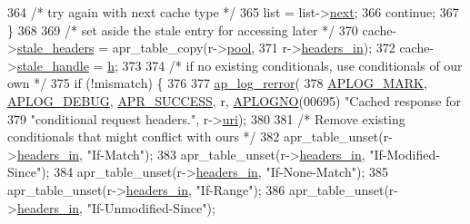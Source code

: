 \begin{DoxyCode}
364                     \textcolor{comment}{/* try again with next cache type */}
365                     list = list->\hyperlink{structcache__provider__list_a87c07afc8bb63fe7fd2e9274e60341a9}{next};
366                     \textcolor{keywordflow}{continue};
367                 \}
368 
369                 \textcolor{comment}{/* set aside the stale entry for accessing later */}
370                 cache->\hyperlink{structcache__request__rec_a7bdf3605a965ddd6b566babb830bde8b}{stale\_headers} = apr\_table\_copy(r->\hyperlink{structrequest__rec_aa0a0c16f9a9ab3901cdb3f3c9c9d83d0}{pool},
371                         r->\hyperlink{structrequest__rec_a5497da6c01af49acf70a4a9b975c1c83}{headers\_in});
372                 cache->\hyperlink{structcache__request__rec_a17c5946aa60de5806a2af38ef7b91507}{stale\_handle} = \hyperlink{group__apr__hash_ga0d6dcb41ca5e794b318df5f6fd273ee2}{h};
373 
374                 \textcolor{comment}{/* if no existing conditionals, use conditionals of our own */}
375                 \textcolor{keywordflow}{if} (!mismatch) \{
376 
377                     \hyperlink{group__APACHE__CORE__LOG_ga4c112558ccffd6b363da102b2052d2a6}{ap\_log\_rerror}(
378                             \hyperlink{group__APACHE__CORE__LOG_ga655e126996849bcb82e4e5a14c616f4a}{APLOG\_MARK}, \hyperlink{group__APACHE__CORE__LOG_gadfcef90537539cf2b7d35cfbbbafeb93}{APLOG\_DEBUG}, 
      \hyperlink{group__apr__errno_ga9ee311b7bf1c691dc521d721339ee2a6}{APR\_SUCCESS}, r, \hyperlink{group__APACHE__CORE__LOG_ga1dee8a07e06bc5b3de8b89662c2cd666}{APLOGNO}(00695) \textcolor{stringliteral}{"Cached response for %
379                             \textcolor{stringliteral}{"conditional request headers."}, r->\hyperlink{structrequest__rec_aee240e90eac55c732891e9408543990b}{uri});
380 
381                     \textcolor{comment}{/* Remove existing conditionals that might conflict with ours */}
382                     apr\_table\_unset(r->\hyperlink{structrequest__rec_a5497da6c01af49acf70a4a9b975c1c83}{headers\_in}, \textcolor{stringliteral}{"If-Match"});
383                     apr\_table\_unset(r->\hyperlink{structrequest__rec_a5497da6c01af49acf70a4a9b975c1c83}{headers\_in}, \textcolor{stringliteral}{"If-Modified-Since"});
384                     apr\_table\_unset(r->\hyperlink{structrequest__rec_a5497da6c01af49acf70a4a9b975c1c83}{headers\_in}, \textcolor{stringliteral}{"If-None-Match"});
385                     apr\_table\_unset(r->\hyperlink{structrequest__rec_a5497da6c01af49acf70a4a9b975c1c83}{headers\_in}, \textcolor{stringliteral}{"If-Range"});
386                     apr\_table\_unset(r->\hyperlink{structrequest__rec_a5497da6c01af49acf70a4a9b975c1c83}{headers\_in}, \textcolor{stringliteral}{"If-Unmodified-Since"});
}
\end{DoxyCode}
